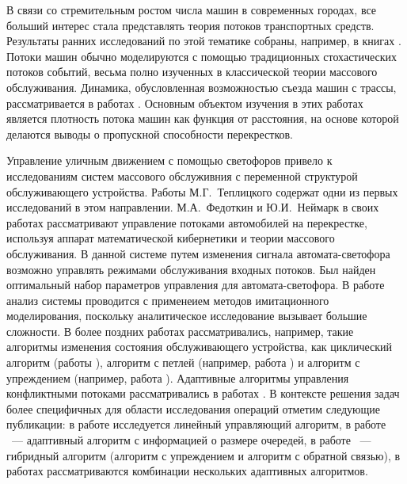 В связи со стремительным ростом числа машин в современных городах, все больший интерес стала представлять теория потоков транспортных средств. Результаты ранних исследований по этой тематике собраны, например, в книгах \cite{Haight:1963, Drew:1968,Inose}. Потоки машин обычно моделируются с помощью традиционных стохастических потоков событий, весьма полно изученных в классической теории массового обслуживания.  Динамика, обусловленная возможностью съезда машин с трассы, рассматривается в работах \cite{AfanasyevaBulinskaya:2013:1,AfanasyevaBulinskaya:2010,AfanasyevaBulinskaya:2013:2}. Основным объектом изучения в этих работах является плотность потока машин как функция от расстояния, на основе которой делаются выводы о пропускной способности перекрестков.

Управление уличным движением с помощью светофоров привело к исследованиям систем массового обслуживния с переменной структурой обслуживающего устройства. Работы М.Г.~Теплицкого \cite{Teplicki:1968, Teplicki:1969} содержат одни из первых исследований в этом направлении. М.А.~Федоткин и Ю.И.~Неймарк в своих работах \cite{Neimark:1966, Fedotkin:1969}  рассматривают управление потоками автомобилей на перекрестке, используя аппарат математической кибернетики и теории массового обслуживания. В данной системе путем изменения сигнала автомата-светофора возможно управлять режимами обслуживания входных потоков. Был найден оптимальный набор параметров управления для автомата-светофора. В работе~\cite{Neimark:1985} анализ системы проводится с применеием методов имитационного моделирования, поскольку аналитическое исследование вызывает большие сложности. В более поздних работах рассматривались, например, такие алгоритмы изменения состояния обслуживающего устройства, как циклический алгоритм (работы \cite{Proidakova:2008, Fedotkin:2014, Zorin:2014}), алгоритм с петлей (например, работа \cite{Zorin:2017}) и алгоритм с упреждением (например, работа \cite{Kuvykina:1990}). Адаптивные алгоритмы управления конфликтными потоками рассматривались в работах \cite{Kudelin:1996, Litvak:2000}. В контексте решения задач более специфичных для области исследования операций отметим следующие публикации: в работе \cite{Dunne:1964} исследуется линейный управляющий алгоритм, в работе \cite{Gordon:1969}~--- адаптивный алгоритм с информацией о размере очередей, в работе \cite{Day2012}~--- гибридный алгоритм (алгоритм с упреждением и алгоритм с обратной связью), в работах \cite{Vasilakos:1990,Cotton:1995,Mason:1999,Kokkonis:2016} рассматриваются комбинации нескольких адаптивных алгоритмов.

